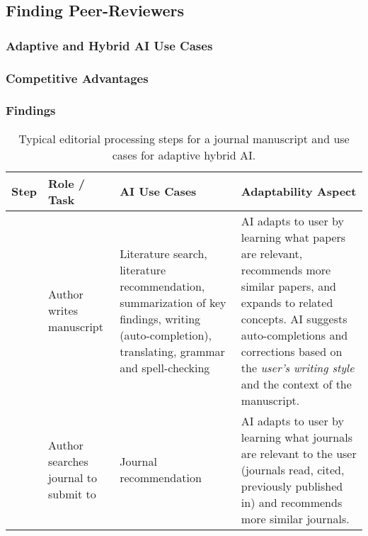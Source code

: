 \subsection{Finding Peer-Reviewers}
\subsubsection*{Adaptive and Hybrid AI Use Cases}
\subsubsection*{Competitive Advantages} 
\subsubsection*{Findings}


\begin{landscape}
    \begin{table}[htb]
        \caption{
            Typical editorial processing steps for a journal manuscript and use cases for adaptive hybrid AI.
        }
        \label{tab:editorialProcess}

        \tiny
        \renewcommand{\arraystretch}{1.1}
        \small\centering
        \setlength\tabcolsep{8pt}
        \begin{tabularx}{\linewidth}{L{0.05} L{0.2} L{0.35} L{0.35}}
            \toprule
            \textbf{Step} & \textbf{Role / Task} & \textbf{AI Use Cases} & \textbf{Adaptability Aspect} \\
            \midrule

             & Author writes manuscript & 
                Literature search, literature recommendation, summarization of key findings, writing (auto-completion), translating, grammar and spell-checking &
                AI adapts to user by learning what papers are relevant, recommends more similar papers, and expands to related concepts. \linebreak
                AI suggests auto-completions and corrections based on the \textit{user's writing style} and the context of the manuscript.
                \\
            \midrule

             & Author searches journal to submit to & Journal recommendation &
                AI adapts to user by learning what journals are relevant to the user (journals read, cited, previously published in)
                and recommends more similar journals.
                \\
            \midrule


\end{tabularx}
\end{table}
\end{landscape}
